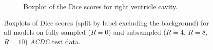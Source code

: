 \documentclass[english,version-2022-01]{uzl-thesis} %
\begin{document}
\begin{figure}[H]
\begin{subfigure}{0.8\textwidth}
    		\caption{Boxplot of the Dice scores for right ventricle cavity.} %
    		\label{fig:Boxplot_DiceScores_RV-Cavity}
	\end{subfigure}
	\caption{Boxplots of Dice scores (split by label excluding the background) for all models on fully sampled ($R=0$) and subsampled ($R=4$, $R=8$, $R=10$) \emph{ACDC} test data.}
	\label{fig:Boxplots_DiceScores}
\end{figure}

\end{document}
